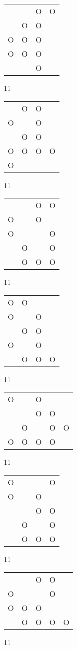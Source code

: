 \begin{tabular}{|m{0.2cm}m{0.2cm}m{0.2cm}m{0.2cm}|}\hline
 & &O&O\\
 &O&O& \\
O&O&O& \\
O&O&O& \\
 & &O& \\
\hline\end{tabular}11
\begin{tabular}{|m{0.2cm}m{0.2cm}m{0.2cm}m{0.2cm}|}\hline
 &O&O& \\
O& &O& \\
 &O&O& \\
O&O&O&O\\
O& & & \\
\hline\end{tabular}11
\begin{tabular}{|m{0.2cm}m{0.2cm}m{0.2cm}m{0.2cm}|}\hline
 & &O&O\\
O& &O& \\
O& & &O\\
 &O& &O\\
 &O&O&O\\
\hline\end{tabular}11
\begin{tabular}{|m{0.2cm}m{0.2cm}m{0.2cm}m{0.2cm}|}\hline
O&O& & \\
O& &O& \\
 &O&O& \\
O& &O& \\
 &O&O&O\\
\hline\end{tabular}11
\begin{tabular}{|m{0.2cm}m{0.2cm}m{0.2cm}m{0.2cm}m{0.2cm}|}\hline
O& &O& & \\
 & &O&O& \\
 &O& &O&O\\
O&O&O&O& \\
\hline\end{tabular}11
\begin{tabular}{|m{0.2cm}m{0.2cm}m{0.2cm}m{0.2cm}|}\hline
O& & &O\\
O& &O& \\
 & &O&O\\
 &O& &O\\
 &O&O&O\\
\hline\end{tabular}11
\begin{tabular}{|m{0.2cm}m{0.2cm}m{0.2cm}m{0.2cm}m{0.2cm}|}\hline
 & &O&O& \\
O& & &O& \\
O&O&O& & \\
 &O&O&O&O\\
\hline\end{tabular}11
